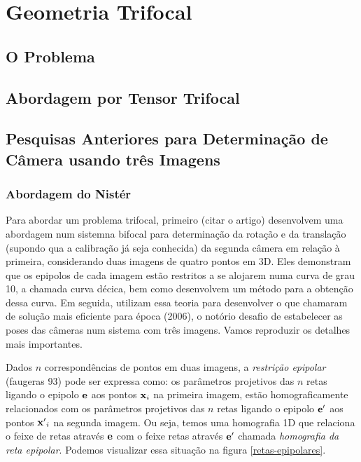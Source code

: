 \section{Geometria Trifocal}

\subsection{O Problema}

\subsection{Abordagem por Tensor Trifocal}

\subsection{Pesquisas Anteriores para Determinação de Câmera usando três Imagens}

\subsubsection{Abordagem do Nistér}

Para abordar um problema trifocal, primeiro (citar o artigo) desenvolvem uma abordagem num sistemna bifocal para determinação da rotação e da translação (supondo qua a calibração já seja conhecida) da segunda câmera em relação à primeira, considerando duas imagens de quatro pontos em 3D. Eles demonstram que os epipolos de cada imagem estão restritos a se alojarem numa curva de grau 10, a chamada curva décica, bem como desenvolvem um método para a obtenção dessa curva. Em seguida, utilizam essa teoria para desenvolver o que chamaram de solução mais eficiente para época (2006), o notório desafio de estabelecer as poses das câmeras num sistema com três imagens. Vamos reproduzir os detalhes mais importantes. 

Dados $n$ correspondências de pontos em duas imagens, a \textit{restrição epipolar} (faugeras 93) pode ser expressa como: os parâmetros projetivos das $n$ retas ligando o epipolo ${\bf e}$ aos pontos ${\bf x}_i$ na primeira imagem, estão homograficamente relacionados com os parâmetros projetivos das $n$ retas ligando o epipolo ${\bf e'}$ aos pontos ${\bf x'}_i$ na segunda imagem. Ou seja, temos uma homografia 1D que relaciona o feixe de retas através ${\bf e}$ com o feixe retas através ${\bf e'}$ chamada \textit{homografia da reta epipolar}. Podemos visualizar essa situação na figura \ref{retas-epipolares}.

